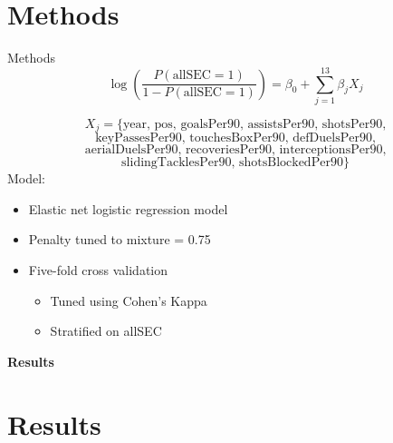 \documentclass{beamer}					%
\begin{document}
\section{Methods}
\begin{frame}{Methods}
\[
\log\left(
\frac{P(\text{allSEC}=1)}
{1-P(\text{allSEC}=1)}
\right)
=
\beta_0
+
\sum_{j=1}^{13}\beta_jX_j
\]

{\footnotesize
\[
X_j =
\{
\text{year, pos, goalsPer90, assistsPer90, shotsPer90,}
\]
\[
\text{keyPassesPer90, touchesBoxPer90, defDuelsPer90,}
\]
\[
\text{aerialDuelsPer90, recoveriesPer90, interceptionsPer90,}
\]
\[
\text{slidingTacklesPer90, shotsBlockedPer90}
\}
\]
}
	Model:
    \begin{itemize}
		\item Elastic net logistic regression model
        \item Penalty tuned to mixture = 0.75
        \item Five-fold cross validation
        \begin{itemize}
            \item Tuned using Cohen's Kappa
            \item Stratified on allSEC
        \end{itemize}
	\end{itemize}
\end{frame}
\begin{frame}[plain]

\centering

\vfill

{\Huge\bfseries Results}

\vfill

\end{frame}

\section{Results}
\end{document}
